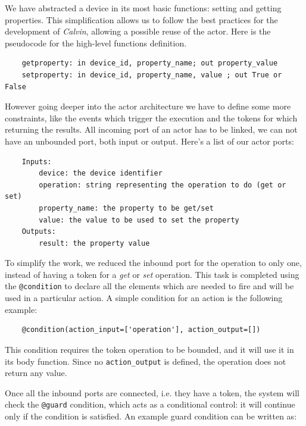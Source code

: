 We have abstracted a device in its most basic functions: setting and getting properties.
This simplification allows us to follow the best practices for the development of \textit{Calvin},
allowing a possible reuse of the actor. Here is the pseudocode for the high-level functions definition.

\begin{verbatim}
    getproperty: in device_id, property_name; out property_value
    setproperty: in device_id, property_name, value ; out True or False
\end{verbatim}


However going deeper into the actor architecture we have to define some more constraints,
like the events which trigger the execution and the tokens for which returning the results.
All incoming port of an actor has to be linked, we can not have an unbounded port,
both input or output. Here's a list of our actor ports:\\

\begin{verbatim}
    Inputs:
        device: the device identifier
        operation: string representing the operation to do (get or set)
        property_name: the property to be get/set
        value: the value to be used to set the property
    Outputs:
        result: the property value
\end{verbatim}

To simplify the work, we reduced the inbound port for the operation to only one, instead of having a token
for a \textit{get} or \textit{set} operation. This task is completed using the \texttt{@condition} to declare
all the elements which are needed to fire and will be used in a particular action.
A simple condition for an action is the following example:
\begin{verbatim}
    @condition(action_input=['operation'], action_output=[])
\end{verbatim}
This condition requires the token operation to be bounded, and it will use it in its body function. Since
no \texttt{action\_output} is defined, the operation does not return any value.

Once all the inbound ports are connected, i.e. they have a token, the system will check the \texttt{@guard} condition,
which acts as a conditional control: it will continue only if the condition is satisfied.
An example guard condition can be written as:

